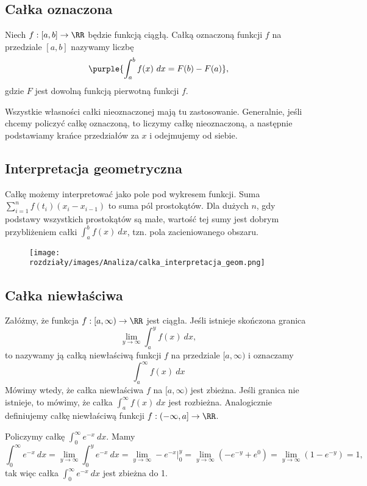\subsection{Całka oznaczona}
Niech $f:[a,b]\to\RR$ będzie funkcją ciągłą. Całką oznaczoną funkcji $f$ na przedziale $[a,b]$ nazywamy liczbę
$$
\purple{\int_a^b f(x)\ dx = F(b) - F(a)},
$$
gdzie $F$ jest dowolną funkcją pierwotną funkcji $f$.

Wszystkie własności całki nieoznaczonej mają tu zastosowanie. Generalnie, jeśli chcemy policzyć całkę oznaczoną, to liczymy całkę nieoznaczoną, a następnie podstawiamy krańce przedziałów za $x$ i odejmujemy od siebie.

\subsection{Interpretacja geometryczna}
Całkę możemy interpretować jako pole pod wykresem funkcji. Suma $\sum_{i=1}^n f(t_i)(x_i-x_{i-1})$ to suma pól prostokątów. Dla dużych $n$, gdy podstawy wszystkich prostokątów są małe, wartość tej sumy jest dobrym przybliżeniem całki $\int_a^b f(x)\ dx$, tzn. pola zacieniowanego obszaru.
\begin{figure}[ht]
    \centering
    \texttt{[image: rozdziały/images/Analiza/calka\_interpretacja\_geom.png]}
\end{figure}

\subsection{Całka niewłaściwa}
Załóżmy, że funkcja $f:[a,\infty)\to\RR$ jest ciągła. Jeśli istnieje skończona granica
$$
\lim_{y\to\infty}\int_a^y f(x)\ dx,
$$
to nazywamy ją całką niewłaściwą funkcji $f$ na przedziale $[a,\infty)$ i oznaczamy
$$
\int_a^\infty f(x)\ dx
$$
Mówimy wtedy, że całka niewłaściwa $f$ na $[a,\infty)$ jest zbieżna. Jeśli granica nie istnieje, to mówimy, że całka $\int_a^\infty f(x)\ dx$ jest rozbieżna. Analogicznie definiujemy całkę niewłaściwą funkcji $f:(-\infty, a]\to\RR$.

\begin{example}
    Policzymy całkę $\int_0^\infty e^{-x}\ dx$. Mamy
    $$
    \int_0^\infty e^{-x}\ dx = \lim_{y\to\infty} \int_0^y e^{-x}\ dx = \lim_{y\to\infty} -e^{-x}\Big|_0^y = \lim_{y\to\infty} (-e^{-y} + e^0) = \lim_{y\to\infty} (1-e^{-y}) = 1,
    $$
    tak więc całka $\int_0^\infty e^{-x}\ dx$ jest zbieżna do 1.
\end{example}

